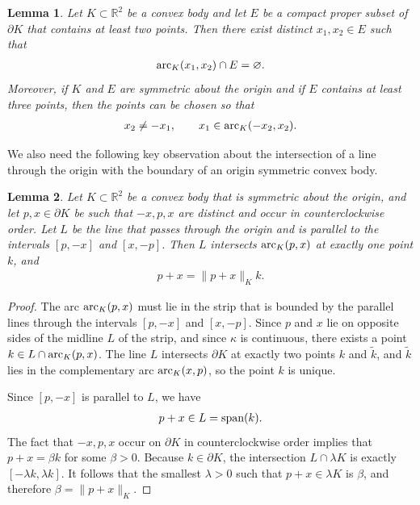\documentclass[11pt]{article}
\newtheorem{lemma}{Lemma}[section]
\begin{document}
\begin{lemma}\label{lemma:arc_lemma}
    Let $K\subset\mathbb{R}^2$ be a convex body and let $E$ be a compact proper subset of $\partial K$ that contains at least two points. Then there exist distinct $x_1,x_2\in E$ such that 
    \begin{align*}
        \textup{arc}_K(x_1,x_2)\cap E=\varnothing.
    \end{align*}
    Moreover, if $K$ and $E$ are symmetric about the origin and if $E$ contains at least three points, then the points can be chosen so that
    \begin{align*}
        x_2\neq -x_1,\qquad x_1\in \textup{arc}_K(-x_2,x_2).
    \end{align*}
\end{lemma}

We also need the following key observation about the intersection of a line through the origin with the boundary of an origin symmetric convex body.

\begin{lemma}\label{lemma:formula_intersection_with_boundary}
    Let $K\subset\mathbb{R}^2$ be a convex body that is symmetric about the origin, and let $p,x\in \partial K$ be such that $-x,p,x$ are distinct and occur in counterclockwise order. Let $L$ be the line that passes through the origin and is parallel to the intervals $[p,-x]$ and $[x,-p]$. Then $L$ intersects $\textup{arc}_K(p,x)$ at exactly one point $k$, and
    \begin{align*}
        p+x=\|p+x\|_Kk.
    \end{align*}
\end{lemma}

\begin{proof}
    The arc $\textup{arc}_K(p,x)$ must lie in the strip that is bounded by the parallel lines through the intervals $[p,-x]$ and $[x,-p]$. Since $p$ and $x$ lie on opposite sides of the midline $L$ of the strip, and since $\kappa$ is continuous, there exists a point $k\in L\cap \textup{arc}_K(p,x)$. The line $L$ intersects $\partial K$ at exactly two points $k$ and $\tilde{k}$, and $\tilde{k}$ lies in the complementary arc $\textup{arc}_K(x,p)$, so the point $k$ is unique.

    Since $[p,-x]$ is parallel to $L$, we have
    \begin{align*}
        p+x\in L=\textup{span}(k).
    \end{align*}
    The fact that $-x,p,x$ occur on $\partial K$ in counterclockwise order implies that $p+x=\beta k$ for some $\beta>0$. Because $k\in \partial K$, the intersection $L\cap \lambda K$ is exactly $[-\lambda k,\lambda k]$. It follows that the smallest $\lambda>0$ such that $p+x\in \lambda K$ is $\beta$, and therefore $\beta=\|p+x\|_K$.
\end{proof}
\end{document}
